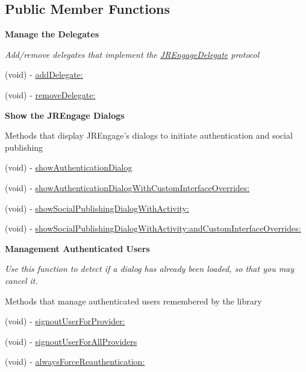 \subsection*{Public Member Functions}
\begin{Indent}{\bf Manage the Delegates}\par
{\em \label{_amgrpf6bb425cb9b7388d33e37d551db6b02e}
 Add/remove delegates that implement the \hyperlink{protocol_j_r_engage_delegate-p}{JREngageDelegate} protocol }\begin{DoxyCompactItemize}
\item 
(void) -\/ \hyperlink{class_j_r_engage_a18377ffb55f821587e6d38b3489692e8}{addDelegate:}
\item 
(void) -\/ \hyperlink{class_j_r_engage_ab3f12ac148ea0f6df4d7ff7789cc7c94}{removeDelegate:}
\end{DoxyCompactItemize}
\end{Indent}
\begin{Indent}{\bf Show the JREngage Dialogs}\par
{\em \label{_amgrp345603279e1df04f4a3678e78089b7be}
 \label{class_j_r_engage_showMethods}
\hypertarget{class_j_r_engage_showMethods}{}


Methods that display JREngage's dialogs to initiate authentication and social publishing }\begin{DoxyCompactItemize}
\item 
(void) -\/ \hyperlink{class_j_r_engage_a01ecdff491f91543e18f33d0e565b046}{showAuthenticationDialog}
\item 
(void) -\/ \hyperlink{class_j_r_engage_a60a7be6770b99c3a929f7c006f1b1203}{showAuthenticationDialogWithCustomInterfaceOverrides:}
\item 
(void) -\/ \hyperlink{class_j_r_engage_afca7b5ab9a57edc1a460aaec882207c4}{showSocialPublishingDialogWithActivity:}
\item 
(void) -\/ \hyperlink{class_j_r_engage_aa84788326df3e8adf4be6128fccb7708}{showSocialPublishingDialogWithActivity:andCustomInterfaceOverrides:}
\end{DoxyCompactItemize}
\end{Indent}
\begin{Indent}{\bf Management Authenticated Users}\par
{\em \label{_amgrp4247d2361fbfb57c620ed69782a50c95}
 Use this function to detect if a dialog has already been loaded, so that you may cancel it.

Methods that manage authenticated users remembered by the library }\begin{DoxyCompactItemize}
\item 
(void) -\/ \hyperlink{class_j_r_engage_af1448791663265d3b739041983fbae92}{signoutUserForProvider:}
\item 
(void) -\/ \hyperlink{class_j_r_engage_a56060e8d5fe94e4bf06ff3edf27af5ee}{signoutUserForAllProviders}
\item 
(void) -\/ \hyperlink{class_j_r_engage_a66dca1abdfd5103480f9a87f65923a68}{alwaysForceReauthentication:}
\end{DoxyCompactItemize}
\end{Indent}

